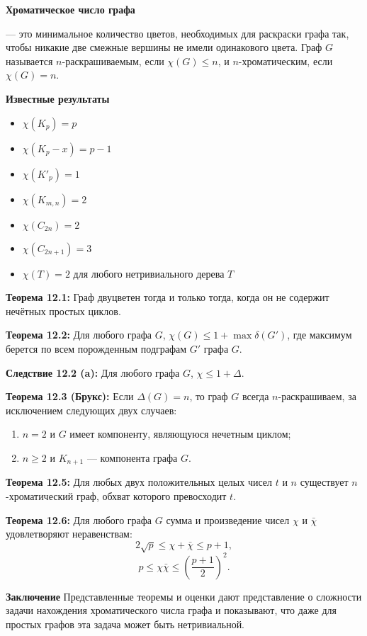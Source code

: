 \textbf{Хроматическое число графа}

 — это минимальное количество цветов, необходимых для раскраски графа так, чтобы никакие две смежные вершины не имели одинакового цвета. Граф $G$ называется $n$-раскрашиваемым, если $\chi(G) \leq n$, и $n$-хроматическим, если $\chi(G) = n$.

\textbf{Известные результаты}
\begin{itemize}
    \item $\chi(K_p) = p$
    \item $\chi(K_p - x) = p - 1$
    \item $\chi(K'_p) = 1$
    \item $\chi(K_{m,n}) = 2$
    \item $\chi(C_{2n}) = 2$
    \item $\chi(C_{2n+1}) = 3$
    \item $\chi(T) = 2$ для любого нетривиального дерева $T$
\end{itemize}


\noindent\textbf{Теорема 12.1:} Граф двуцветен тогда и только тогда, когда он не содержит нечётных простых циклов.

\noindent\textbf{Теорема 12.2:} Для любого графа $G$, $\chi(G) \leq 1 + \max \delta(G')$, где максимум берется по всем порожденным подграфам $G'$ графа $G$.

\noindent\textbf{Следствие 12.2 (a):} Для любого графа $G$, $\chi \leq 1 + \Delta$.

\noindent\textbf{Теорема 12.3 (Брукс):} Если $\Delta(G) = n$, то граф $G$ всегда $n$-раскрашиваем, за исключением следующих двух случаев:
\begin{enumerate}
    \item $n = 2$ и $G$ имеет компоненту, являющуюся нечетным циклом;
    \item $n \geq 2$ и $K_{n+1}$ — компонента графа $G$.
\end{enumerate}

\noindent\textbf{Теорема 12.5:} Для любых двух положительных целых чисел $t$ и $n$ существует $n$-хроматический граф, обхват которого превосходит $t$.

\noindent\textbf{Теорема 12.6:} Для любого графа $G$ сумма и произведение чисел $\chi$ и $\bar{\chi}$ удовлетворяют неравенствам:
\begin{equation}
2\sqrt{p} \leq \chi + \bar{\chi} \leq p + 1,
\end{equation}
\begin{equation}
p \leq \chi \bar{\chi} \leq \left( \frac{p + 1}{2} \right)^2.
\end{equation}

\textbf{Заключение}
Представленные теоремы и оценки дают представление о сложности задачи нахождения хроматического числа графа и показывают, что даже для простых графов эта задача может быть нетривиальной.
